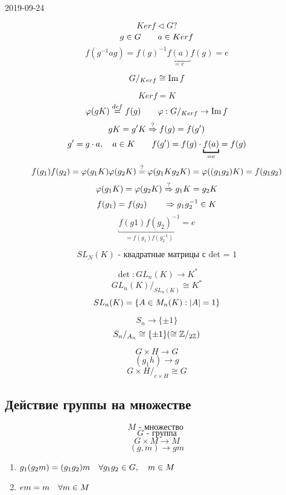 \documentclass[12pt, fleqn]{article}
\begin{document}
\begin{lect} {2019-09-24}
	\begin{Proof}
	    \[Ker f \triangleleft G ?\]
		\[g \in G \quad\quad a \in Ker f\]
		\[f(g^{-1} a g) = f(g)^{-1} \underbracket{f(a)}_{= e} f(g) = e\]
	\end{Proof}

	\begin{Utv} 
			\[G/_{Ker f} \cong \mathop{\rm Im}\nolimits f \]
	\end{Utv}
	\begin{Proof}
			\[Ker f = K\]
			\[\varphi(gK) \overset{def}{=} f(g) \quad\quad \varphi: G/_{Ker f} \to \mathop{\rm Im}\nolimits f\]
			\[gK = g'K \overset{?}{\Rightarrow} f(g) = f(g')\]
			\[g' = g \cdot a, \q a \in K \q\q f(g') = f(g) \cdot \underbracket{f(a)}_{= e} = f(g) \]
			\[f(g_1)f(g_2) = \varphi(g_1K) \varphi(g_2K) \overset{?}{=} \varphi(g_1 K g_2 K) = \varphi((g_1g_2)K) =
			f(g_1g_2)\]
			\[\varphi(g_1K) = \varphi(g_2K) \overset{?}{\Rightarrow} g_1K = g_2 K\]
			\[f(g_1) = f(g_2) \quad\quad \Rightarrow g_1 g_2^{-1} \in K \]
			\[\underbracket{f(g1)f(g_2)^{-1}}_{= f(g_1)f(g_2^{-1})}  = e \]
	\end{Proof}

	\begin{Reminder}
		\[SL_N(K) \text{ - квадратные матрицы с det = 1}\]
	\end{Reminder}

	\begin{Definition}
		\[\det: GL_n(K) \to K^*\] %
		\[GL_n(K) / _{SL_n(K)} \cong K^*\]
		\[SL_n(K) = \{A \in M_n(K) : \left|A\right| = 1\}\]
	\end{Definition}

	\begin{Example}[1]
			\[S_n \to \{\pm 1\}\]
			\[S_n / _{A_n} \cong \{\pm 1\} (\cong \mathbb{Z}/_{2\mathbb{Z}} ) \]
	\end{Example}

	\begin{Example}[2]
		\[G \times H \to G\]
		\[(g_1 h) \to g\]
		\[G \times H /_{e \times H} \cong G\]
	\end{Example}

	\subsection{Действие группы на множестве}
	\begin{Definition}
		\[M \text{ - множество } \]
		\[G \text{ - группа}\]
		\[G \times M \to  M\]
		\[(g, m) \to gm\]
		\begin{enumerate}
			\item $g_1(g_2m) = (g_1g_2)m \quad \forall g_1 g_2 \in G, \quad m \in M$
			\item $em = m \quad \forall m \in  M$
		\end{enumerate}
	\end{Definition}
\end{lect}
\end{document}
